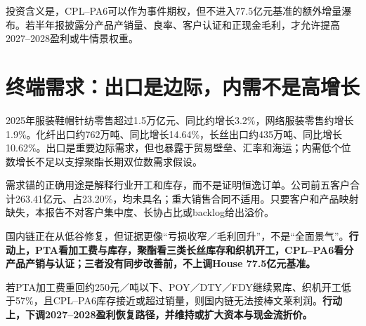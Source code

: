 投资含义是，CPL--PA6可以作为事件期权，但不进入77.5亿元基准的额外增量瀑布。若半年报披露分产品产销量、良率、客户认证和正现金毛利，才允许提高2027--2028盈利或牛情景权重。

\section{终端需求：出口是边际，内需不是高增长}

2025年服装鞋帽针纺零售超过1.5万亿元、同比约增长3.2\%，网络服装零售约增长1.9\%。化纤出口约762万吨、同比增长14.64\%，长丝出口约435万吨、同比增长10.62\%。出口是重要边际需求，但也暴露于贸易壁垒、汇率和海运；内需低个位数增长不足以支撑聚酯长期双位数需求假设。

需求锚的正确用途是解释行业开工和库存，而不是证明恒逸订单。公司前五客户合计263.41亿元、占23.20\%，均未具名；重大销售合同不适用。只要客户和产品映射缺失，本报告不对客户集中度、长协占比或backlog给出溢价。

\begin{keyinsight}
国内链正在从低谷修复，但证据更像“亏损收窄／毛利回升”，不是“全面景气”。\textbf{行动上，PTA看加工费与库存，聚酯看三类长丝库存和织机开工，CPL--PA6看分产品产销与认证；三者没有同步改善前，不上调House 77.5亿元基准。}
\end{keyinsight}

\begin{riskbox}[国内链失效条件]
若PTA加工费重回约250元／吨以下、POY／DTY／FDY继续累库、织机开工低于57\%，且CPL--PA6库存接近或超过销量，则国内链无法接棒文莱利润。\textbf{行动上，下调2027--2028盈利恢复路径，并维持或扩大资本与现金流折价。}
\end{riskbox}
